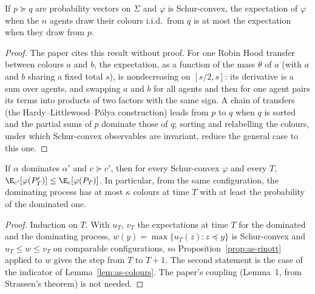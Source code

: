 \begin{proposition}\label{prop:as-rinott}
\leanok
{}
If $p\succeq q$ are probability vectors on $\Sigma$ and $\varphi$ is Schur-convex, the
expectation of $\varphi$ when the $n$ agents draw their colours i.i.d.\ from $q$ is at most the
expectation when they draw from $p$.
\end{proposition}
\begin{proof}\leanok
The paper cites this result without proof. For one Robin Hood transfer between colours $a$ and
$b$, the expectation, as a function of the mass $\theta$ of $a$ (with $a$ and $b$ sharing a fixed
total $s$), is nondecreasing on $[s/2,s]$: its derivative is a sum over agents, and swapping $a$
and $b$ for all agents and then for one agent pairs its terms into products of two factors with
the same sign. A chain of transfers (the Hardy--Littlewood--P\'olya construction) leads from $p$
to $q$ when $q$ is sorted and the partial sums of $p$ dominate those of $q$; sorting and
relabelling the colours, under which Schur-convex observables are invariant, reduce the general
case to this one.
\end{proof}

\begin{theorem}\label{thm:as-comparison}
\leanok
{}
If $\alpha$ dominates $\alpha'$ and $c\succeq c'$, then for every Schur-convex $\varphi$ and every
$T$, $\E_{c'}[\varphi(P'_T)]\le\E_c[\varphi(P_T)]$. In particular, from the same configuration,
the dominating process has at most $\kappa$ colours at time $T$ with at least the probability of
the dominated one.
\end{theorem}
\begin{proof}\leanok
Induction on $T$. With $u_T$, $v_T$ the expectations at time $T$ for the dominated and the
dominating process, $w(y)=\max\{u_T(z):z\preceq y\}$ is Schur-convex and $u_T\le w\le v_T$ on
comparable configurations, so Proposition~\ref{prop:as-rinott} applied to $w$ gives the step
from $T$ to $T+1$. The second statement is the case of the indicator of
Lemma~\ref{lem:as-colours}. The paper's coupling (Lemma~1, from Strassen's theorem) is not
needed.
\end{proof}

